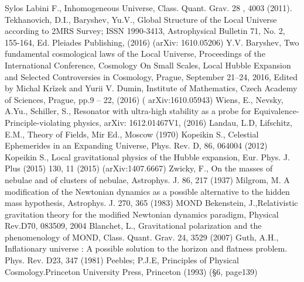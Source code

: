 \begin{thebibliography}{}
Sylos Labini F., Inhomogeneous Universe, Class. Quant. Grav. 28 , 4003  (2011).
Tekhanovich, D.I., Baryshev, Yu.V., Global Structure of the Local Universe according to 2MRS Survey; ISSN 1990-3413, Astrophysical Bulletin 71, No. 2, 155-164, Ed. Pleiades Publishing, (2016)  (arXiv: 1610.05206)
Y.V. Baryshev, Two fundamental cosmological laws of the Local Universe, Proceedings of the International Conference, Cosmology On Small Scales, Local Hubble Expansion and Selected Controversies in Cosmology, Prague, September 21–24, 2016, Edited by Michal Kr\v{i}zek and Yurii V. Dumin, Institute of Mathematics, Czech Academy of Sciences, Prague, pp.9 – 22, (2016) ( arXiv:1610.05943)
Wiens, E., Nevsky, A.Yu., Schiller, S., Resonator with ultra-high stability as a probe for Equivalence-Principle-violating physics, arXiv: 1612.01467V1, (2016)
Landau, L.D, Lifschitz, E.M., Theory of Fields, Mir Ed., Moscow (1970)
Kopeikin S., Celestial Ephemerides in an Expanding Universe, Phys. Rev. D, 86, 064004 (2012)
 Kopeikin S., Local gravitational physics of the Hubble expansion, Eur. Phys. J. Plus (2015) 130, 11 (2015) (arXiv:1407.6667)
Zwicky, F., On the masses of nebulae and of clusters of nebulae, Astrophys. J. 86, 217 (1937)
Milgrom, M.  A modification of the Newtonian dynamics as a possible alternative to the hidden mass hypothesis, Astrophys. J. 270, 365 (1983)    MOND
Bekenstein, J.,Relativistic gravitation theory for the modified Newtonian dynamics paradigm, Physical Rev.D70, 083509, 2004
Blanchet, L., Gravitational polarization and the phenomenology of MOND, Class. Quant. Grav. 24, 3529 (2007)
 Guth, A.H., Inflationary universe : A possible solution to the horizon and flatness problem. Phys. Rev. D23, 347 (1981)
Peebles; P.J.E, Principles of Physical Cosmology.Princeton University Press, Princeton (1993) (\S6, page139)






\end{thebibliography}



